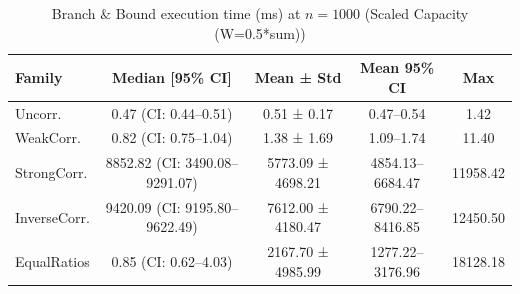\begin{table}[tb]
\centering
\caption{Branch $\&$ Bound execution time (ms) at $n=1000$ (Scaled Capacity (W=0.5*sum))}
\label{tab:scaled-bb-time}
\begin{tabular}{lcccc}
\toprule
Family & Median [95\% CI] & Mean ± Std & Mean 95\% CI & Max \\
\midrule
Uncorr. & 0.47 (CI: 0.44–0.51) & 0.51 ± 0.17 & 0.47–0.54 & 1.42 \\
WeakCorr. & 0.82 (CI: 0.75–1.04) & 1.38 ± 1.69 & 1.09–1.74 & 11.40 \\
StrongCorr. & 8852.82 (CI: 3490.08–9291.07) & 5773.09 ± 4698.21 & 4854.13–6684.47 & 11958.42 \\
InverseCorr. & 9420.09 (CI: 9195.80–9622.49) & 7612.00 ± 4180.47 & 6790.22–8416.85 & 12450.50 \\
EqualRatios & 0.85 (CI: 0.62–4.03) & 2167.70 ± 4985.99 & 1277.22–3176.96 & 18128.18 \\
\bottomrule
\end{tabular}
\end{table}
